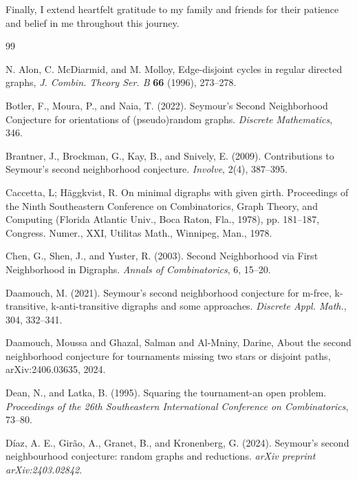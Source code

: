 \documentclass[AMS, Times1COL]{article} %
\theoremstyle{definition}
\begin{document}
	Finally, I extend heartfelt gratitude to my family and friends for their patience and belief in me throughout this journey.
	
	\begin{thebibliography}{99}
		
		 N. Alon, C. McDiarmid, and M. Molloy, Edge-disjoint cycles in regular directed graphs, \emph{J. Combin. Theory Ser. B} \textbf{66} (1996), 273--278.
		
		 Botler, F., Moura, P., and Naia, T. (2022). Seymour's Second Neighborhood Conjecture for orientations of (pseudo)random graphs. \textit{Discrete Mathematics}, 346.
		
		 Brantner, J., Brockman, G., Kay, B., and Snively, E. (2009). Contributions to Seymour's second neighborhood conjecture. \textit{Involve}, 2(4), 387--395.
		
		 Caccetta, L; H\"{a}ggkvist, R. On minimal digraphs with given girth. Proceedings of the Ninth Southeastern Conference on Combinatorics, Graph Theory, and Computing (Florida Atlantic Univ., Boca Raton, Fla., 1978), pp. 181--187, Congress. Numer., XXI, Utilitas Math., Winnipeg, Man., 1978.
		
		 Chen, G., Shen, J., and Yuster, R. (2003). Second Neighborhood via First Neighborhood in Digraphs. \textit{Annals of Combinatorics}, 6, 15--20.
		
		 Daamouch, M. (2021). Seymour's second neighborhood conjecture for m-free, k-transitive, k-anti-transitive digraphs and some approaches. \textit{Discrete Appl. Math.}, 304, 332--341.
		
		 Daamouch, Moussa and Ghazal, Salman and Al-Mniny, Darine, About the second neighborhood conjecture for tournaments missing two stars or disjoint paths, arXiv:2406.03635, 2024.
		
		 Dean, N., and Latka, B. (1995). Squaring the tournament-an open problem. \textit{Proceedings of the 26th Southeastern International Conference on Combinatorics}, 73--80.
		
		 Díaz, A. E., Girão, A., Granet, B., and Kronenberg, G. (2024). Seymour's second neighbourhood conjecture: random graphs and reductions. \textit{arXiv preprint arXiv:2403.02842}.
		

\end{thebibliography}
\end{document}
